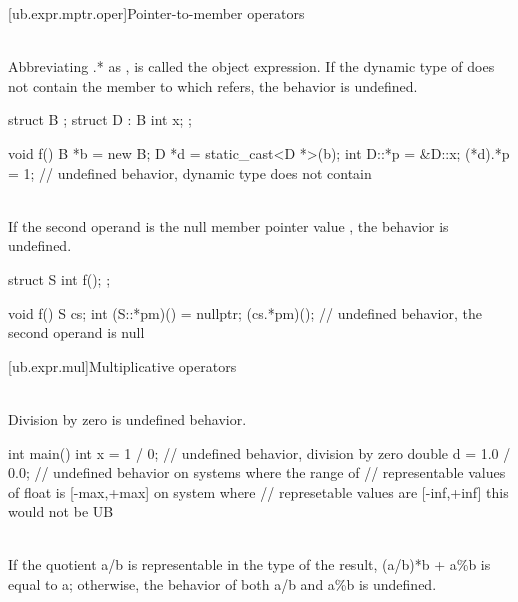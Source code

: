 [ub.expr.mptr.oper]{Pointer-to-member operators}

\pnum
{} \\
Abbreviating .* as ,  is called the object expression. If the dynamic type
of  does not contain the member to which  refers, the behavior is undefined.

\pnum
\begin{example}
\begin{codeblock}
struct B {};
struct D : B {
  int x;
};

void f() {
  B *b = new B;
  D *d = static_cast<D *>(b);
  int D::*p = &D::x;
  (*d).*p = 1;          // undefined behavior, dynamic type  does not contain 
}
\end{codeblock}
\end{example}


\pnum
{} \\
If the second operand is the null
member pointer value , the behavior is undefined.

\pnum
\begin{example}
\begin{codeblock}
struct S {
  int f();
};

void f() {
  S cs;
  int (S::*pm)() = nullptr;
  (cs.*pm)();           // undefined behavior, the second operand is null
}
\end{codeblock}
\end{example}


[ub.expr.mul]{Multiplicative operators}

\pnum
{} \\
Division by zero is undefined behavior.

\pnum
\begin{example}
\begin{codeblock}
int main() {
  int x = 1 / 0;        // undefined behavior, division by zero
  double d = 1.0 / 0.0; // undefined behavior on systems where the range of
                        // representable values of float is [-max,+max] on system where
                        // represetable values are [-inf,+inf] this would not be UB
}
\end{codeblock}
\end{example}

\pnum
{} \\
If the
quotient a/b is representable in the type of the result, (a/b)*b + a\%b is equal to a; otherwise, the behavior
of both a/b and a\%b is undefined.

